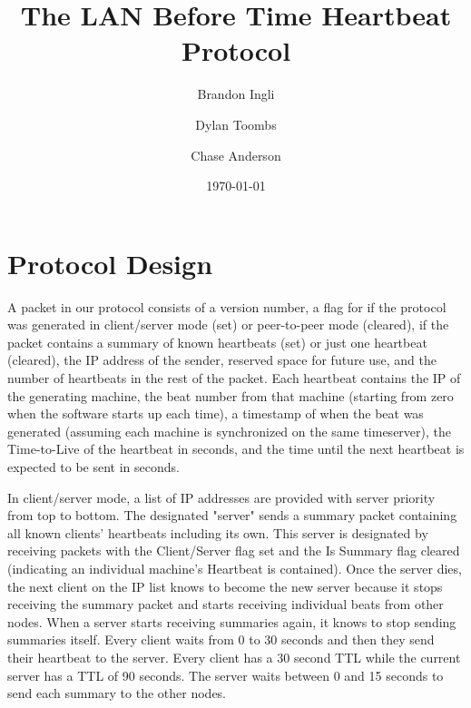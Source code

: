 \documentclass[11pt]{article}
\title{The LAN Before Time Heartbeat Protocol}
\author{Brandon Ingli \and Dylan Toombs \and Chase Anderson}
\date{\today}
\begin{document}
  \maketitle

  \section{Protocol Design}
  A packet in our protocol consists of a version number, a flag for if the protocol 
  was generated in client/server mode (set) or peer-to-peer mode (cleared), if 
  the packet contains a summary of known heartbeats (set) or just one heartbeat 
  (cleared), the IP address of the sender, reserved space for future use, and 
  the number of heartbeats in the rest of the packet. Each heartbeat contains 
  the IP of the generating machine, the beat number from that machine (starting 
  from zero when the software starts up each time), a timestamp of when the 
  beat was generated (assuming each machine is synchronized on the same 
  timeserver), the Time-to-Live of the heartbeat in seconds, and the time until the next 
  heartbeat is expected to be sent in seconds.

  In client/server mode, a list of IP addresses are provided with server
  priority from top to bottom. The designated "server" sends a summary packet
  containing all known clients' heartbeats including its own. This server is
  designated by receiving packets with the Client/Server flag set and the Is 
  Summary flag cleared (indicating an individual machine's Heartbeat is contained). 
  Once the server dies, the next client on the IP
  list knows to become the new server because it stops receiving the summary
  packet and starts receiving individual beats from other nodes. When a server 
  starts receiving summaries again, it knows to stop sending summaries itself. 
  Every client
  waits from 0 to 30 seconds and then they send their heartbeat to the server.
  Every client has a 30 second TTL while the current server has a TTL of
  90 seconds. The server waits between 0 and 15 seconds to send each summary 
  to the other nodes.
\end{document}
